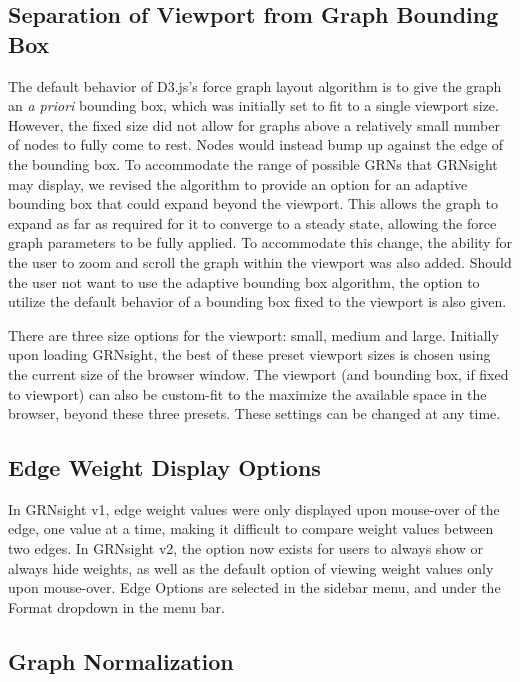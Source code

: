 \documentclass[sigconf,review]{acmart}
\begin{document}
\subsection{Separation of Viewport from Graph Bounding Box}
The default behavior of D3.js's force graph layout algorithm is to give the graph an \emph{a priori} bounding box, which was initially set to fit to a single viewport size. However, the fixed size did not allow for graphs above a relatively small number of nodes to fully come to rest. Nodes would instead bump up against the edge of the bounding box. To accommodate the range of possible GRNs that GRNsight may display, we revised the algorithm to provide an option for an adaptive bounding box that could expand beyond the viewport. This allows the graph to expand as far as required for it to converge to a steady state, allowing the force graph parameters to be fully applied. To accommodate this change, the ability for the user to zoom and scroll the graph within the viewport was also added. Should the user not want to use the adaptive bounding box algorithm, the option to utilize the default behavior of a bounding box fixed to the viewport is also given.

There are three size options for the viewport: small, medium and large. Initially upon loading GRNsight, the best of these preset viewport sizes is chosen using the current size of the browser window. The viewport (and bounding box, if fixed to viewport) can also be custom-fit to the maximize the available space in the browser, beyond these three presets. These settings can be changed at any time. 

\subsection{Edge Weight Display Options}
In GRNsight v1, edge weight values were only displayed upon mouse-over of the edge, one value at a time, making it difficult to compare weight values between two edges. In GRNsight v2, the option now exists for users to always show or always hide weights, as well as the default option of viewing weight values only upon mouse-over. Edge Options are selected in the sidebar menu, and under the Format dropdown in the menu bar.

\subsection{Graph Normalization}
\end{document}
